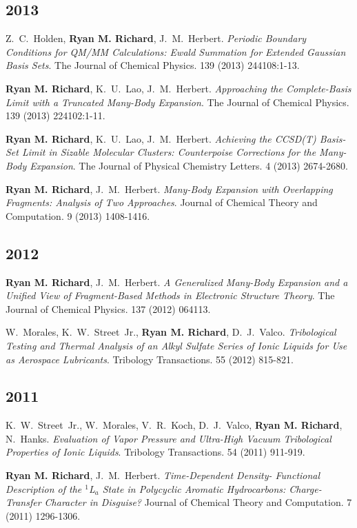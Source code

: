 \documentclass[11pt,a4paper,sans]{moderncv}
\begin{document}
\begin{etaremune}
	\subsection{2013}
	\item{Z.~C.~Holden, \textbf{Ryan M. Richard}, J.~M.~Herbert.  {\em Periodic 
	      Boundary Conditions for QM/MM Calculations: Ewald Summation for 
		  Extended Gaussian Basis Sets}.  The Journal of Chemical Physics.  
		  139 (2013) 244108:1-13.}
	\item{\textbf{Ryan M. Richard}, K.~U.~Lao, J.~M.~Herbert.  {\em Approaching
	      the Complete-Basis Limit with a Truncated Many-Body Expansion}.  The 
		  Journal of Chemical Physics.  139 (2013) 224102:1-11.}
	\item{\textbf{Ryan M. Richard}, K.~U.~Lao, J.~M.~Herbert.  {\em Achieving 
	      the CCSD(T) Basis-Set Limit in Sizable Molecular Clusters: 
		  Counterpoise Corrections for the Many-Body Expansion}.  The Journal of
		  Physical Chemistry Letters.  4 (2013) 2674-2680.}
	\item{\textbf{Ryan M. Richard}, J.~M.~Herbert. {\em Many-Body Expansion with
	      Overlapping Fragments: Analysis of Two Approaches}.  Journal of 
		  Chemical Theory and Computation.  9 (2013) 1408-1416.}

	\subsection{2012}
	\item{\textbf{Ryan M. Richard}, J.~M.~Herbert.  {\em A Generalized Many-Body
	      Expansion and a Unified View of Fragment-Based Methods in Electronic 
		  Structure Theory}. The Journal of Chemical Physics. 137 (2012) 
		  064113.}
	\item{W.~Morales, K.~W.~Street~Jr., \textbf{Ryan M. Richard}, D.~J.~Valco.  
	      {\em Tribological Testing and Thermal Analysis of an Alkyl Sulfate 
		  Series of Ionic Liquids for Use as Aerospace Lubricants}.  Tribology 
		  Transactions.  55 (2012) 815-821.}

	\subsection{2011}
	\item{K.~W.~Street~Jr., W.~Morales, V.~R.~Koch, D.~J.~Valco, 
	      \textbf{Ryan M. Richard}, N.~Hanks.  {\em Evaluation of Vapor Pressure
		  and Ultra-High Vacuum Tribological Properties of Ionic Liquids}. 
		  Tribology Transactions.  54 (2011) 911-919.}
	\item{\textbf{Ryan M. Richard},  J.~M.~Herbert. {\em Time-Dependent Density-
	      Functional Description of the $^1$L$_a$ State in Polycyclic Aromatic 
		  Hydrocarbons: Charge-Transfer Character in Disguise?} Journal of 
		  Chemical Theory and Computation. 7 (2011) 1296-1306. }


\end{etaremune}
\end{document}
